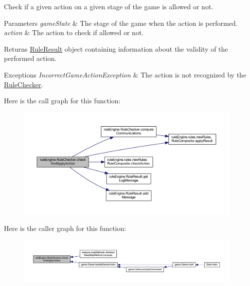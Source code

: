 Check if a given action on a given stage of the game is allowed or not.


\begin{DoxyParams}{Parameters}
{\em game\+State} & The stage of the game when the action is performed. \\
\hline
{\em action} & The action to check if allowed or not. \\
\hline
\end{DoxyParams}
\begin{DoxyReturn}{Returns}
\mbox{\hyperlink{classrule_engine_1_1_rule_result}{Rule\+Result}} object containing information about the validity of the performed action. 
\end{DoxyReturn}

\begin{DoxyExceptions}{Exceptions}
{\em Incorrect\+Game\+Action\+Exception} & The action is not recognized by the \mbox{\hyperlink{classrule_engine_1_1_rule_checker}{Rule\+Checker}}. \\
\hline
\end{DoxyExceptions}
Here is the call graph for this function\+:
\nopagebreak
\begin{figure}[H]
\begin{center}
\leavevmode
\includegraphics[width=350pt]{classrule_engine_1_1_rule_checker_a864194ca6149949900274c5b369abfc2_cgraph}
\end{center}
\end{figure}
Here is the caller graph for this function\+:
\nopagebreak
\begin{figure}[H]
\begin{center}
\leavevmode
\includegraphics[width=350pt]{classrule_engine_1_1_rule_checker_a864194ca6149949900274c5b369abfc2_icgraph}
\end{center}
\end{figure}
\mbox{\label{classrule_engine_1_1_rule_checker_a271924d22d328a894f36885c6d7f3833}} 
